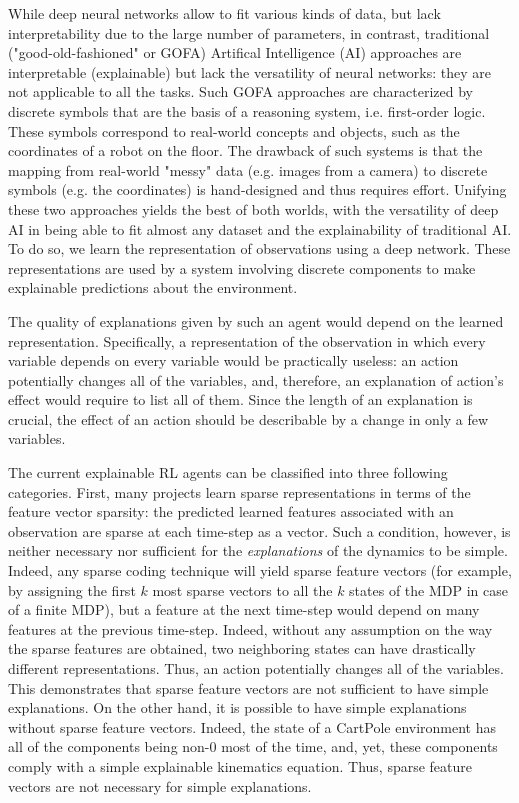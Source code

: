 \documentclass[a4paper,11pt,oneside]{report}
\begin{document}
While deep neural networks allow to fit various kinds of data, but lack interpretability due to the large number of parameters, in contrast, traditional ("good-old-fashioned" or GOFA) Artifical Intelligence (AI) approaches are interpretable (explainable) but lack the versatility of neural networks: they are not applicable to all the tasks.
Such GOFA approaches are characterized by discrete symbols that are the basis of a reasoning system, i.e. first-order logic.
These symbols correspond to real-world concepts and objects, such as the coordinates of a robot on the floor.
The drawback of such systems is that the mapping from real-world "messy" data (e.g. images from a camera) to discrete symbols (e.g. the coordinates) is hand-designed and thus requires effort.
Unifying these two approaches yields the best of both worlds, with the versatility of deep AI in being able to fit almost any dataset and the explainability of traditional AI.
To do so, we learn the representation of observations using a deep network. These representations are used by a system involving discrete components to make explainable predictions about the environment.

The quality of explanations given by such an agent would depend on the learned representation. Specifically, a representation of the observation in which every variable depends on every variable would be practically useless: an action potentially changes all of the variables, and, therefore, an explanation of action's effect would require to list all of them. Since the length of an explanation is crucial, the effect of an action should be describable by a change in only a few variables.

The current explainable RL agents can be classified into three following categories. First, many projects learn sparse representations in terms of the feature vector sparsity: the predicted learned features associated with an observation are sparse at each time-step as a vector. Such a condition, however, is neither necessary nor sufficient for the {\em explanations} of the dynamics to be simple. Indeed, any sparse coding technique will yield sparse feature vectors (for example, by assigning the first $k$ most sparse vectors to all the $k$ states of the MDP in case of a finite MDP), but a feature at the next time-step would depend on many features at the previous time-step. Indeed, without any assumption on the way the sparse features are obtained, two neighboring states can have drastically different representations. Thus, an action potentially changes all of the variables. This demonstrates that sparse feature vectors are not sufficient to have simple explanations. On the other hand, it is possible to have simple explanations without sparse feature vectors. Indeed, the state of a CartPole environment has all of the components being non-0 most of the time, and, yet, these components comply with a simple explainable kinematics equation. Thus, sparse feature vectors are not necessary for simple explanations.
\end{document}
